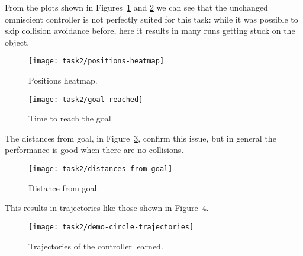 From the plots shown in Figures~\ref{fig:positions-heatmap-2} and 
\ref{fig:goal-reached-2} we can see that the unchanged omniscient controller is 
not perfectly suited for this task: while it was possible to skip collision 
avoidance before, here it results in many runs getting stuck on the object.

\begin{figure}[htbp]
	\centerline{\texttt{[image: task2/positions-heatmap]}}
	\caption{Positions heatmap.}
	\label{fig:positions-heatmap-2}
\end{figure}

\begin{figure}[htbp]
	\centerline{\texttt{[image: task2/goal-reached]}}
	\caption{Time to reach the goal.}
	\label{fig:goal-reached-2}
\end{figure}

The distances from goal, in Figure~\ref{fig:distances-from-goal-2}, confirm 
this issue, but in general the performance is good when there are no collisions.

\begin{figure}[htbp]
	\centerline{\texttt{[image: task2/distances-from-goal]}}
	\caption{Distance from goal.}
	\label{fig:distances-from-goal-2}
\end{figure}

This results in trajectories like those shown in 
Figure~\ref{fig:demo-circle-trajectories-2}.

\begin{figure}[htbp]
	\centerline{\texttt{[image: task2/demo-circle-trajectories]}}
	\caption{Trajectories of the controller learned.}
	\label{fig:demo-circle-trajectories-2}
\end{figure}